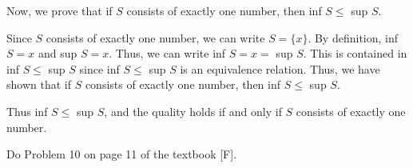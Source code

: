 \documentclass[addpoints]{exam}
\begin{document}
\begin{questions}
Now, we prove that if $S$ consists of exactly one number, then inf $S \leq$ sup $S$.

Since $S$ consists of exactly one number, we can write $S = \{x\}$. By definition, inf $S = x$ and sup $S = x$.
Thus, we can write inf $S = x =$ sup $S$. This is contained in inf $S \leq$ sup $S$ since inf $S \leq$ sup $S$ 
is an equivalence relation. Thus, we have shown that if $S$ consists of exactly one number, then inf $S \leq$ sup $S$.

Thus inf $S \leq$ sup $S$, and the quality holds if and only if $S$ consists of exactly one number.


\question Do Problem 10 on page 11 of the textbook [F].



\end{questions}
\end{document}
